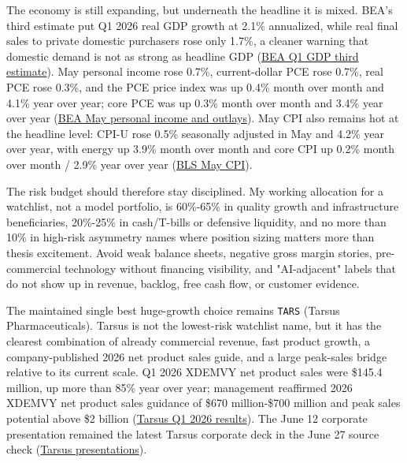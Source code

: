 \documentclass[
  9pt,
]{article}
\begin{document}
The economy is still expanding, but underneath the headline it is mixed.
BEA's third estimate put Q1 2026 real GDP growth at 2.1\% annualized,
while real final sales to private domestic purchasers rose only 1.7\%, a
cleaner warning that domestic demand is not as strong as headline GDP
(\href{https://www.bea.gov/news/2026/gdp-third-estimate-industries-corporate-profits-state-gdp-and-state-personal-income-1st}{BEA
Q1 GDP third estimate}). May personal income rose 0.7\%, current-dollar
PCE rose 0.7\%, real PCE rose 0.3\%, and the PCE price index was up
0.4\% month over month and 4.1\% year over year; core PCE was up 0.3\%
month over month and 3.4\% year over year
(\href{https://www.bea.gov/news/2026/personal-income-and-outlays-may-2026}{BEA
May personal income and outlays}). May CPI also remains hot at the
headline level: CPI-U rose 0.5\% seasonally adjusted in May and 4.2\%
year over year, with energy up 3.9\% month over month and core CPI up
0.2\% month over month / 2.9\% year over year
(\href{https://www.bls.gov/news.release/cpi.nr0.htm}{BLS May CPI}).

The risk budget should therefore stay disciplined. My working allocation
for a watchlist, not a model portfolio, is 60\%-65\% in quality growth
and infrastructure beneficiaries, 20\%-25\% in cash/T-bills or defensive
liquidity, and no more than 10\% in high-risk asymmetry names where
position sizing matters more than thesis excitement. Avoid weak balance
sheets, negative gross margin stories, pre-commercial technology without
financing visibility, and "AI-adjacent" labels that do not show up in
revenue, backlog, free cash flow, or customer evidence.

The maintained single best huge-growth choice remains \texttt{TARS}
(Tarsus Pharmaceuticals). Tarsus is not the lowest-risk watchlist name,
but it has the clearest combination of already commercial revenue, fast
product growth, a company-published 2026 net product sales guide, and a
large peak-sales bridge relative to its current scale. Q1 2026 XDEMVY
net product sales were \$145.4 million, up more than 85\% year over
year; management reaffirmed 2026 XDEMVY net product sales guidance of
\$670 million-\$700 million and peak sales potential above \$2 billion
(\href{https://ir.tarsusrx.com/news-releases/news-release-details/tarsus-reports-first-quarter-2026-financial-results-and-recent/}{Tarsus
Q1 2026 results}). The June 12 corporate presentation remained the
latest Tarsus corporate deck in the June 27 source check
(\href{https://ir.tarsusrx.com/events-and-presentations/presentations/}{Tarsus
presentations}).
\end{document}
